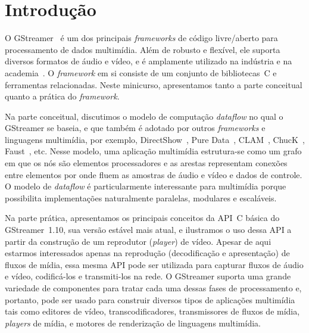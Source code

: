 \documentclass{SBCbookchapter}
\def\en#1{\foreignlanguage{english}{\emph{#1}}}
\begin{document}

\section{Introdução}
\label{sec:intro}

O GStreamer~\cite{gstreamer} é um dos principais \en{frameworks} de código
livre/aberto para processamento de dados multimídia.  Além de robusto e
flexível, ele suporta diversos formatos de áudio e vídeo, e é amplamente
utilizado na indústria e na academia~\cite{gstreamer-apps}.
O \en{framework} em si consiste de um conjunto de bibliotecas~C e
ferramentas relacionadas.  Neste minicurso, apresentamos tanto a parte
conceitual quanto a prática do \en{framework}.

Na parte conceitual, discutimos o modelo de computação \en{dataflow} no qual
o GStreamer se baseia, e que também é adotado por outros \en{frameworks} e
linguagens multimídia, por exemplo, DirectShow~\cite{Chatterjee-A-1997},
Pure Data~\cite{Puckette-M-S-2007}, CLAM~\cite{Amatriain-X-2008},
ChucK~\cite{Wang-G-2003}, Faust~\cite{Orlarey-Y-2009}, etc.  Nesse modelo,
uma aplicação multimídia estrutura-se como um grafo em que os nós são
elementos processadores e as arestas representam conexões entre elementos
por onde fluem as amostras de áudio e vídeo e dados de controle.  O modelo
de \en{dataflow} é particularmente interessante para multimídia porque
possibilita implementações naturalmente paralelas, modulares e escaláveis.

Na parte prática, apresentamos os principais conceitos da API~C básica do
GStreamer~1.10, sua versão estável mais atual, e ilustramos o uso dessa API
a partir da construção de um reprodutor (\en{player}) de vídeo.  Apesar de
aqui estarmos interessados apenas na reprodução (decodificação e
apresentação) de fluxos de mídia, essa mesma API pode ser utilizada para
capturar fluxos de áudio e vídeo, codificá-los e transmiti-los na rede.
O GStreamer suporta uma grande variedade de componentes para tratar cada uma
dessas fases de processamento e, portanto, pode ser usado para construir
diversos tipos de aplicações multimídia tais como editores de vídeo,
transcodificadores, transmissores de fluxos de mídia, \en{players} de mídia,
e motores de renderização de linguagens multimídia.
\end{document}
